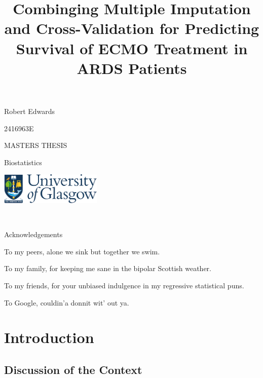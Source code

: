 \documentclass[12pt,]{article}
\title{Combinging Multiple Imputation and Cross-Validation for Predicting
Survival of ECMO Treatment in ARDS Patients}
\author{}
\date{}
\begin{document}
\maketitle

\vspace{4cm}

\begin{center}
Robert Edwards 

\vspace{0.125cm}
2416963E


\vspace{1cm}
MASTERS THESIS 

\vspace{0.125cm}
Biostatistics

\vspace{9cm}
  \includegraphics[height = 1.5cm]{images/GUlogo.png}
\end{center}

\newpage

\begin{center}
~
 
\vspace{5cm}
Acknowledgements 

\vspace{3cm}
To my peers, alone we sink but together we swim.

\vspace{1cm}
To my family, for keeping me sane in the bipolar Scottish weather. 

\vspace{1cm}
To my friends, for your unbiased indulgence in my regressive statistical puns. 

\vspace{1cm}
To Google, couldin'a donnit wit' out ya. 

\end{center}

\newpage 

\setcounter{tocdepth}{2} \tableofcontents  

\newpage

\section{Introduction}\label{introduction}

\subsection{Discussion of the Context}\label{discussion-of-the-context}
\end{document}
